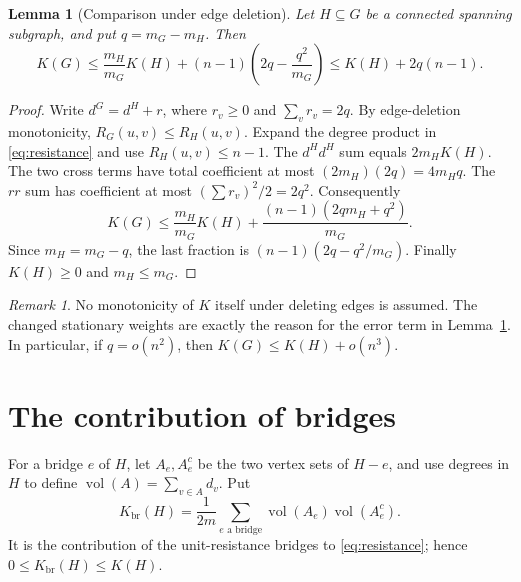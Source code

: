 \documentclass[11pt]{amsart}
\numberwithin{equation}{section}
\newtheorem{lemma}[theorem]{Lemma}
\theoremstyle{definition}
\theoremstyle{remark}
\newtheorem{remark}[theorem]{Remark}
\newcommand{\Vol}{\operatorname{vol}}
\newcommand{\Kbr}{K_{\mathrm{br}}}
\begin{document}
\begin{lemma}[Comparison under edge deletion]\label{lem:deletion}
Let $H\subseteq G$ be a connected spanning subgraph, and put $q=m_G-m_H$. Then
\begin{equation}\label{eq:deletion}
K(G)\le\frac{m_H}{m_G}K(H)
+(n-1)\left(2q-\frac{q^2}{m_G}\right)
\le K(H)+2q(n-1).
\end{equation}
\end{lemma}
\begin{proof}
Write $d^G=d^H+r$, where $r_v\ge0$ and $\sum_vr_v=2q$. By edge-deletion monotonicity, $R_G(u,v)\le R_H(u,v)$. Expand the degree product in \eqref{eq:resistance} and use $R_H(u,v)\le n-1$. The $d^Hd^H$ sum equals $2m_HK(H)$. The two cross terms have total coefficient at most $(2m_H)(2q)=4m_Hq$. The $rr$ sum has coefficient at most $(\sum r_v)^2/2=2q^2$. Consequently
\[
K(G)\le\frac{m_H}{m_G}K(H)
+\frac{(n-1)(2qm_H+q^2)}{m_G}.
\]
Since $m_H=m_G-q$, the last fraction is $(n-1)(2q-q^2/m_G)$. Finally $K(H)\ge0$ and $m_H\le m_G$.
\end{proof}

\begin{remark}
No monotonicity of $K$ itself under deleting edges is assumed. The changed stationary weights are exactly the reason for the error term in Lemma~\ref{lem:deletion}. In particular, if $q=o(n^2)$, then $K(G)\le K(H)+o(n^3)$.
\end{remark}

\section{The contribution of bridges}\label{sec:bridges}
For a bridge $e$ of $H$, let $A_e,A_e^c$ be the two vertex sets of $H-e$, and use degrees in $H$ to define $\Vol(A)=\sum_{v\in A}d_v$. Put
\begin{equation}\label{eq:Kbrdef}
\Kbr(H)=\frac1{2m}\sum_{e\text{ a bridge}}
\Vol(A_e)\Vol(A_e^c).
\end{equation}
It is the contribution of the unit-resistance bridges to \eqref{eq:resistance}; hence $0\le\Kbr(H)\le K(H)$.
\end{document}
